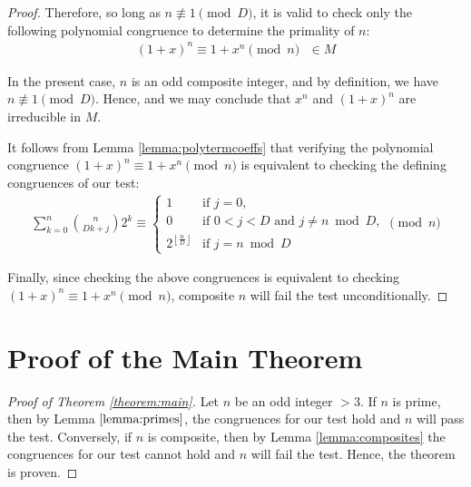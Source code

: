 \documentclass{article}
\theoremstyle{plain}
\theoremstyle{definition}
\newcommand{\floor}[1]{\left\lfloor #1 \right\rfloor}
\newcommand{\Mx}{M}
\begin{document}
\begin{proof}
Therefore, so long as $n \not\equiv 1 \pmod{D}$, it is valid to check only the following polynomial congruence to determine the primality of $n$:
\begin{align}
    (1 + x)^n \equiv 1 + x^n \pmod{n} \text{ } \in M
\end{align}

In the present case, $n$ is an odd composite integer, and by definition, we have $n \not\equiv 1 \pmod{D}$. Hence, and we may conclude that $x^n$ and $(1+x)^n$ are irreducible in $\Mx$.

It follows from Lemma \ref{lemma:polytermcoeffs} that verifying the polynomial congruence $(1 + x)^n \equiv 1 + x^n \pmod{n}$ is equivalent to checking the defining congruences of our test:
\begin{align*}
    \sum_{k=0}^{n} \binom{n}{Dk + j} 2^k
    \equiv
    \begin{cases} 
        1 & \text{if } j=0, \\
        0 & \text{if } 0 < j < D \text{ and } j \neq n \bmod{D}, \\
        2^{\floor{\frac{n}{D}}} & \text{if } j = n \bmod{D}
    \end{cases}
    \pmod{n}
\end{align*}

Finally, since checking the above congruences is equivalent to checking $(1 + x)^n \equiv 1 + x^n \pmod{n}$, composite $n$ will fail the test unconditionally.
\end{proof}

\section{Proof of the Main Theorem}
\begin{proof}[Proof of Theorem \ref{theorem:main}]
Let \( n \) be an odd integer $>3$. If $n$ is prime, then by Lemma $\ref{lemma:primes}$, the congruences for our test hold and $n$ will pass the test. Conversely, if $n$ is composite, then by Lemma \ref{lemma:composites} the congruences for our test cannot hold and $n$ will fail the test. Hence, the theorem is proven.
\end{proof}
\end{document}
